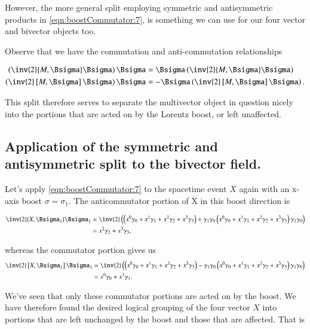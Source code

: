 However, the more general split employing symmetric and antisymmetric products in \ref{eqn:boostCommutator:7}, is something we can use for our four vector and bivector objects too.

Observe that we have the commutation and anti-commutation relationships

\begin{align}\label{eqn:boostCommutator:9}
\left( \inv{2} \symmetric{M}{\Bsigma} \Bsigma \right) \Bsigma &= \Bsigma \left( \inv{2} \symmetric{M}{\Bsigma} \Bsigma \right) \\
\left( \inv{2} \antisymmetric{M}{\Bsigma} \Bsigma \right) \Bsigma &= -\Bsigma \left( \inv{2} \antisymmetric{M}{\Bsigma} \Bsigma \right).
\end{align}

This split therefore serves to separate the multivector object in question nicely into the portions that are acted on by the Lorentz boost, or left unaffected.

\subsection{Application of the symmetric and antisymmetric split to the bivector field.}

Let's apply \ref{eqn:boostCommutator:7} to the spacetime event $X$ again with an x-axis boost $\sigma = \sigma_1$.  The anticommutator portion of X in this boost direction is

\begin{align*}
\inv{2} \symmetric{X}{\Bsigma_1} \Bsigma_1
&=
\inv{2} \left(
\left( 
x^0 \gamma_0 + 
x^1 \gamma_1 + 
x^2 \gamma_2 + 
x^3 \gamma_3 \right)
+
\gamma_1 \gamma_0
\left( 
x^0 \gamma_0 + 
x^1 \gamma_1 + 
x^2 \gamma_2 + 
x^3 \gamma_3 \right) 
\gamma_1 \gamma_0
\right) \\
&=
x^2 \gamma_2 + x^3 \gamma_3,
\end{align*}

whereas the commutator portion gives us
\begin{align*}
\inv{2} \antisymmetric{X}{\Bsigma_1} \Bsigma_1
&=
\inv{2} \left(
\left( 
x^0 \gamma_0 + 
x^1 \gamma_1 + 
x^2 \gamma_2 + 
x^3 \gamma_3 \right)
-
\gamma_1 \gamma_0
\left( 
x^0 \gamma_0 + 
x^1 \gamma_1 + 
x^2 \gamma_2 + 
x^3 \gamma_3 \right) 
\gamma_1 \gamma_0
\right) \\
&=
x^0 \gamma_0 + x^1 \gamma_1.
\end{align*}

We've seen that only these commutator portions are acted on by the boost.  We have therefore found the desired logical grouping of the four vector $X$ into portions that are left unchanged by the boost and those that are affected.  That is

